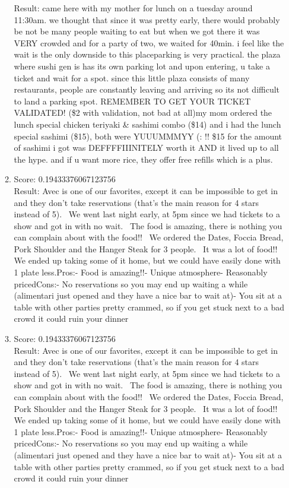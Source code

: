 \documentclass[paper=a4, fontsize=11pt]{jhwhw} %
\begin{document}
\begin{itemize}
\begin{enumerate}
Result: came here with my mother for lunch on a tuesday around 11:30am. we thought that since it was pretty early, there would probably be not be many people waiting to eat but when we got there it was VERY crowded and for a party of two, we waited for 40min. i feel like the wait is the only downside to this placeparking is very practical. the plaza where sushi gen is has its own parking lot and upon entering, u take a ticket and wait for a spot. since this little plaza consists of many restaurants, people are constantly leaving and arriving so its not difficult to land a parking spot. REMEMBER TO GET YOUR TICKET VALIDATED! (\$2 with validation, not bad at all)my mom ordered the lunch special chicken teriyaki \& sashimi combo (\$14) and i had the lunch special sashimi (\$15), both were YUUUMMMYY (: !! \$15 for the amount of sashimi i got was DEFFFFIIINITELY worth it AND it lived up to all the hype. and if u want more rice, they offer free refills which is a plus.
\item Score: 0.19433376067123756\\
Result: Avec is one of our favorites, except it can be impossible to get in and they don't take reservations (that's the main reason for 4 stars instead of 5).  We went last night early, at 5pm since we had tickets to a show and got in with no wait.  The food is amazing, there is nothing you can complain about with the food!!  We ordered the Dates, Foccia Bread, Pork Shoulder and the Hanger Steak for 3 people.  It was a lot of food!! We ended up taking some of it home, but we could have easily done with 1 plate less.Pros:- Food is amazing!!- Unique atmosphere- Reasonably pricedCons:- No reservations so you may end up waiting a while (alimentari just opened and they have a nice bar to wait at)- You sit at a table with other parties pretty crammed, so if you get stuck next to a bad crowd it could ruin your dinner
\item Score: 0.19433376067123756\\
Result: Avec is one of our favorites, except it can be impossible to get in and they don't take reservations (that's the main reason for 4 stars instead of 5).  We went last night early, at 5pm since we had tickets to a show and got in with no wait.  The food is amazing, there is nothing you can complain about with the food!!  We ordered the Dates, Foccia Bread, Pork Shoulder and the Hanger Steak for 3 people.  It was a lot of food!! We ended up taking some of it home, but we could have easily done with 1 plate less.Pros:- Food is amazing!!- Unique atmosphere- Reasonably pricedCons:- No reservations so you may end up waiting a while (alimentari just opened and they have a nice bar to wait at)- You sit at a table with other parties pretty crammed, so if you get stuck next to a bad crowd it could ruin your dinner

\end{enumerate}
\end{itemize}
\end{document}
